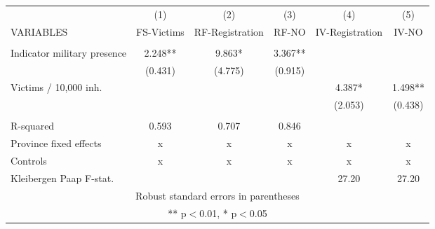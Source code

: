 \begin{tabular}{lccccc} \hline
 & (1) & (2) & (3) & (4) & (5) \\
VARIABLES & FS-Victims & RF-Registration & RF-NO & IV-Registration & IV-NO \\ \hline
 &  &  &  &  &  \\
Indicator military presence & 2.248** & 9.863* & 3.367** &  &  \\
 & (0.431) & (4.775) & (0.915) &  &  \\
Victims / 10,000 inh. &  &  &  & 4.387* & 1.498** \\
 &  &  &  & (2.053) & (0.438) \\
 &  &  &  &  &  \\
R-squared & 0.593 & 0.707 & 0.846 &  &  \\
Province fixed effects & x & x & x & x & x \\
Controls & x & x & x & x & x \\
 Kleibergen Paap F-stat. &  &  &  & 27.20 & 27.20 \\ \hline
\multicolumn{6}{c}{ Robust standard errors in parentheses} \\
\multicolumn{6}{c}{ ** p$<$0.01, * p$<$0.05} \\
\end{tabular}
